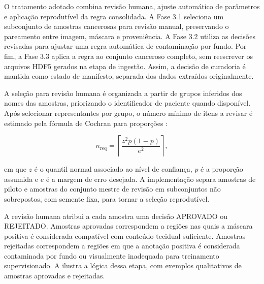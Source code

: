 O tratamento adotado combina revisão humana, ajuste automático de parâmetros e
aplicação reprodutível da regra consolidada. A Fase 3.1 seleciona um subconjunto
de amostras cancerosas para revisão manual, preservando o pareamento entre
imagem, máscara e proveniência. A Fase 3.2 utiliza as decisões revisadas para
ajustar uma regra automática de contaminação por fundo. Por fim, a Fase 3.3
aplica a regra ao conjunto canceroso completo, sem reescrever os arquivos HDF5
gerados na etapa de ingestão. Assim, a decisão de curadoria é mantida como
estado de manifesto, separada dos dados extraídos originalmente.

A seleção para revisão humana é organizada a partir de grupos inferidos dos
nomes das amostras, priorizando o identificador de paciente quando disponível. Após selecionar representantes por grupo, o número mínimo de itens a revisar é
estimado pela fórmula de Cochran para proporções \cite{charan2013sample}:

\begin{equation}
    n_{\mathrm{req}} =
    \left\lceil
    \frac{z^2p(1-p)}{e^2}
    \right\rceil ,
    \label{eq:cochran}
\end{equation}

em que $z$ é o quantil normal associado ao nível de confiança, $p$ é a proporção
assumida e $e$ é a margem de erro desejada. A implementação separa amostras de
piloto e amostras do conjunto mestre de revisão em subconjuntos não sobrepostos,
com semente fixa, para tornar a seleção reprodutível.

A revisão humana atribui a cada amostra uma decisão APROVADO ou
REJEITADO. Amostras aprovadas correspondem a regiões nas quais a máscara
positiva é considerada compatível com conteúdo tecidual suficiente. Amostras
rejeitadas correspondem a regiões em que a anotação positiva é considerada
contaminada por fundo ou visualmente inadequada para treinamento supervisionado.
A  ilustra a lógica dessa etapa, com
exemplos qualitativos de amostras aprovadas e rejeitadas.

